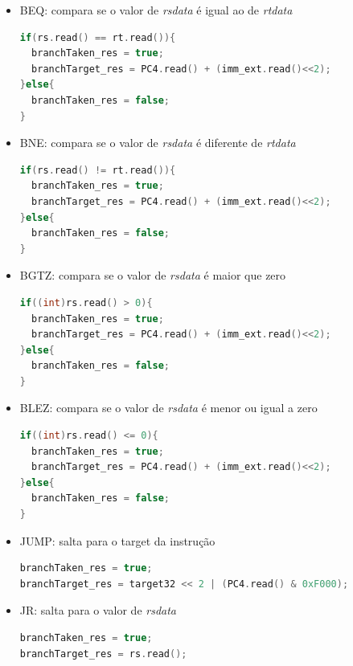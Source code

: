 \documentclass[pdftex,12pt,a4paper]{report}
\begin{document}
\begin{itemize}
\item BEQ: compara se o valor de \textit{rsdata} é igual ao de \textit{rtdata}

\begin{lstlisting}[language=c]
if(rs.read() == rt.read()){
  branchTaken_res = true;
  branchTarget_res = PC4.read() + (imm_ext.read()<<2);
}else{
  branchTaken_res = false;
}
\end{lstlisting} 

\item BNE: compara se o valor de \textit{rsdata} é diferente de \textit{rtdata} 

\begin{lstlisting}[language=c]
if(rs.read() != rt.read()){
  branchTaken_res = true;
  branchTarget_res = PC4.read() + (imm_ext.read()<<2);
}else{
  branchTaken_res = false;
}
\end{lstlisting} 

\item BGTZ: compara se o valor de \textit{rsdata} é maior que zero

\begin{lstlisting}[language=c]
if((int)rs.read() > 0){
  branchTaken_res = true;
  branchTarget_res = PC4.read() + (imm_ext.read()<<2);
}else{
  branchTaken_res = false;
}
\end{lstlisting} 

\item BLEZ: compara se o valor de \textit{rsdata} é menor ou igual a zero

\begin{lstlisting}[language=c]
if((int)rs.read() <= 0){
  branchTaken_res = true;
  branchTarget_res = PC4.read() + (imm_ext.read()<<2);
}else{
  branchTaken_res = false;
}
\end{lstlisting} 

\item JUMP: salta para o target da instrução

\begin{lstlisting}[language=c]
branchTaken_res = true;
branchTarget_res = target32 << 2 | (PC4.read() & 0xF000);
\end{lstlisting} 

\item JR: salta para o valor de \textit{rsdata}

\begin{lstlisting}[language=c]
branchTaken_res = true;
branchTarget_res = rs.read();
\end{lstlisting} 

\end{itemize} 
\end{document}

